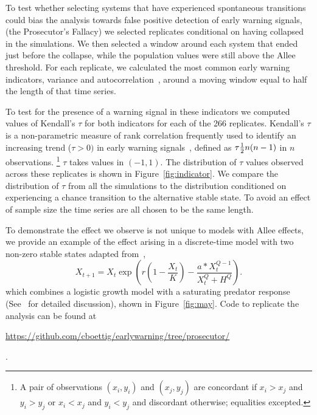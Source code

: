 \documentclass[authoryear,review,12pt]{elsarticle}
\begin{document}
To test whether selecting systems that have experienced
spontaneous transitions could bias the analysis towards false
positive detection of early warning signals, (the Prosecutor's
Fallacy) we selected replicates conditional on having collapsed
in the simulations.  We then selected a window around each system
that ended just before the collapse, while the population values
were still above the Allee threshold.  For each replicate, we
calculated the most common early warning indicators, variance and
autocorrelation~\citep[\emph{e.g.}][]{Carpenter2006,Dakos2008,Scheffer2009},
around a moving window equal to half the length of that time series.


To test for the presence of a warning signal in these indicators we
computed values of Kendall's $\tau$ for both indicators for each of
the 266 replicates.  Kendall's $\tau$ is a non-parametric measure
of rank correlation frequently used to identify an increasing trend
($\tau > 0 )$ in early warning signals~\citep{Dakos2008, Dakos2011},
defined as $\tau \def \tfrac{(\text{number of concordant pairs}) -
(\text{number of discordant pairs})}{\frac{1}{2} n (n-1) }$ in $n$
observations.  \footnote{A pair of observations $(x_i,y_i)$ and $(x_j,
y_j)$ are concordant if $x_i > x_j$ and $y_i > y_j$ or $x_i < x_j$ and
$y_i < y_j$ and discordant otherwise; equalities excepted.}  $\tau$ takes
values in $(-1, 1)$.  The distribution of $\tau$ values observed across
these replicates is shown in Figure~\ref{fig:indicator}.  We compare
the distribution of $\tau$ from all the simulations to the distribution
conditioned on experiencing a chance transition to the alternative
stable state.  To avoid an effect of sample size the time series are
all chosen to be the same length.


To demonstrate the effect we observe is not unique to models with Allee
effects, we provide an example of the effect arising in a discrete-time
model with two non-zero stable states adapted from~\citep{May1977},
\begin{equation}
X_{t+1} = X_t \exp\left( r \left(1 - \frac{ X_t }{ K } \right) - \frac{ a * X_t ^ {Q - 1} }{X_t ^ Q + H ^ Q} \right). \label{May1977}
\end{equation}
which combines a logistic growth model with a saturating predator response (See~\citet{May1977} for detailed discussion), shown in Figure~\ref{fig:may}.  Code to replicate the analysis can be found at \\ 
\begin{sloppy}\href{https://github.com/cboettig/earlywarning/tree/prosecutor/}{https://github.com/cboettig/earlywarning/tree/prosecutor/}\end{sloppy}.
\end{document}
